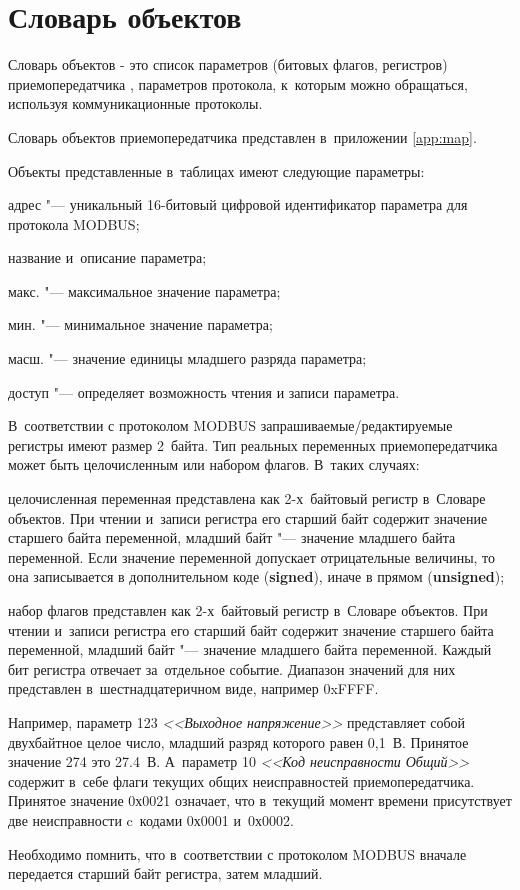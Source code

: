 \section{Словарь объектов} \label{sec:map}

Словарь объектов - это список параметров (битовых флагов, регистров) приемопередатчика , параметров протокола, к~которым можно обращаться, используя коммуникационные протоколы.

Словарь объектов приемопередатчика \deviceCurrent{} представлен в~приложении \ref{app:map}.

Объекты представленные в~таблицах имеют следующие параметры:
\begin{list}{--}{}
\item адрес "--- уникальный 16-битовый цифровой идентификатор параметра для протокола MODBUS;  
\item название и~описание параметра;
\item макс. "--- максимальное значение параметра;
\item мин. "--- минимальное значение параметра;
\item масш. "--- значение единицы младшего разряда параметра;
\item доступ "--- определяет возможность чтения и записи параметра.
\end{list}

В~соответствии с протоколом MODBUS запрашиваемые/редактируемые регистры имеют размер 2~байта. Тип реальных переменных приемопередатчика может быть целочисленным или набором флагов. В~таких случаях: 
\begin{list}{--}{}
\item целочисленная переменная представлена как 2-х~байтовый регистр в~Словаре объектов. При чтении и~записи регистра его старший байт содержит значение старшего байта переменной, младший байт "--- значение младшего байта переменной. Если значение переменной допускает отрицательные величины, то она записывается в дополнительном коде (\textbf{signed}), иначе в прямом (\textbf{unsigned});
\item набор флагов представлен как 2-х~байтовый регистр в~Словаре объектов. При чтении и~записи регистра его старший байт содержит значение старшего байта переменной, младший байт "--- значение младшего байта переменной. Каждый бит регистра отвечает за~отдельное событие. Диапазон значений для них представлен в~шестнадцатеричном виде, например 0xFFFF.
\end{list}

Например, параметр 123 \textit{<<Выходное напряжение>>} представляет собой двухбайтное целое число, младший разряд которого равен 0,1~В. Принятое значение 274 это 27.4~В. А~параметр 10 \textit{<<Код неисправности Общий>>} содержит в~себе флаги текущих общих неисправностей приемопередатчика. Принятое значение 0х0021 означает, что в~текущий момент времени присутствует две неисправности c~кодами 0х0001 и~0х0002.

Необходимо помнить, что в~соответствии с протоколом MODBUS вначале передается старший байт регистра, затем младший. 
